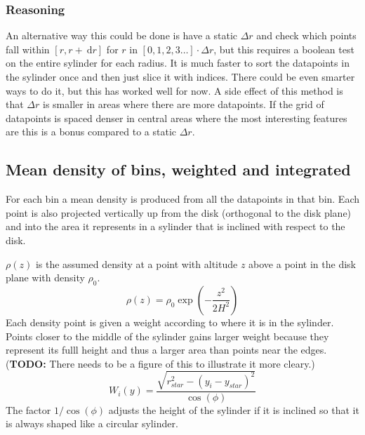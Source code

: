\documentclass[a4paper, 12pt, english, titlepage]{article}
\newcommand{\D}[1]{\ \mathrm{d}#1} %
\begin{document}
    \subsubsection{Reasoning}
        An alternative way this could be done is have a static $\Delta r$ and check which points fall within $[r, r + \D r]$ for $r$ in $[0, 1, 2, 3 \hdots]\cdot\Delta r$, but this requires a boolean test on the entire sylinder for each radius. It is much faster to sort the datapoints in the sylinder once and then just slice it with indices. There could be even smarter ways to do it, but this has worked well for now. A side effect of this method is that $\Delta r$ is smaller in areas where there are more datapoints. If the grid of datapoints is spaced denser in central areas where the most interesting features are this is a bonus compared to a static $\Delta r$.


\subsection{Mean density of bins, weighted and integrated}
    For each bin a mean density is produced from all the datapoints in that bin. Each point is also projected vertically up from the disk (orthogonal to the disk plane) and into the area it represents in a sylinder that is inclined with respect to the disk.

    $\rho(z)$ is the assumed density at a point with altitude $z$ above a point in the disk plane with density $\rho_0$.
    $$
    \rho(z) = \rho_0 \exp\left(- \frac{z^2}{2H^2}\right)
    $$
    Each density point is given a weight according to where it is in the sylinder. Points closer to the middle of the sylinder gains larger weight because they represent its fulll height and thus a larger area than points near the edges.
    (\textbf{TODO:} There needs to be a figure of this to illustrate it more cleary.)
    $$
    W_i(y) = \frac{\sqrt{r_{star}^2 - (y_i - y_{star})^2}}{\cos(\phi)}
    $$
    The factor $1/\cos(\phi)$ adjusts the height of the sylinder if it is inclined so that it is always shaped like a circular sylinder.
\end{document}
